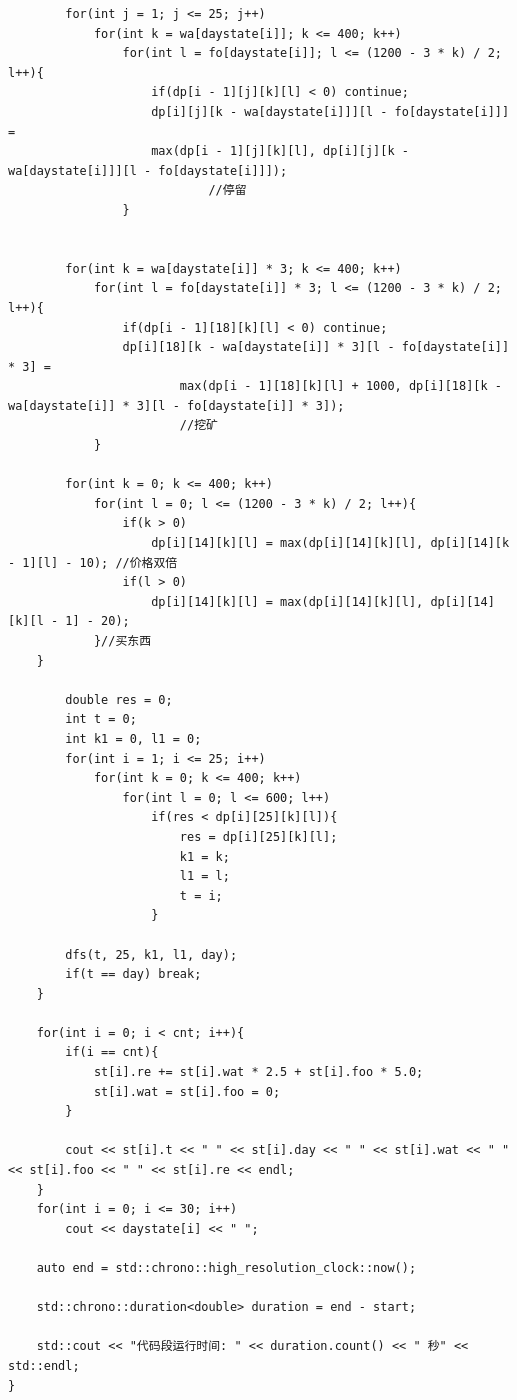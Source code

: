 \begin{verbatim}
        for(int j = 1; j <= 25; j++)
            for(int k = wa[daystate[i]]; k <= 400; k++)   
                for(int l = fo[daystate[i]]; l <= (1200 - 3 * k) / 2; l++){
                    if(dp[i - 1][j][k][l] < 0) continue;
                    dp[i][j][k - wa[daystate[i]]][l - fo[daystate[i]]] = 
                    max(dp[i - 1][j][k][l], dp[i][j][k - wa[daystate[i]]][l - fo[daystate[i]]]);
                            //停留
                }

        
        for(int k = wa[daystate[i]] * 3; k <= 400; k++)   
            for(int l = fo[daystate[i]] * 3; l <= (1200 - 3 * k) / 2; l++){
                if(dp[i - 1][18][k][l] < 0) continue;
                dp[i][18][k - wa[daystate[i]] * 3][l - fo[daystate[i]] * 3] = 
                        max(dp[i - 1][18][k][l] + 1000, dp[i][18][k - wa[daystate[i]] * 3][l - fo[daystate[i]] * 3]);
                        //挖矿
            }

        for(int k = 0; k <= 400; k++)   
            for(int l = 0; l <= (1200 - 3 * k) / 2; l++){
                if(k > 0)
                    dp[i][14][k][l] = max(dp[i][14][k][l], dp[i][14][k - 1][l] - 10); //价格双倍
                if(l > 0)
                    dp[i][14][k][l] = max(dp[i][14][k][l], dp[i][14][k][l - 1] - 20);
            }//买东西
    }

        double res = 0;
        int t = 0;
        int k1 = 0, l1 = 0;
        for(int i = 1; i <= 25; i++)
            for(int k = 0; k <= 400; k++)
                for(int l = 0; l <= 600; l++)
                    if(res < dp[i][25][k][l]){
                        res = dp[i][25][k][l];
                        k1 = k;
                        l1 = l;
                        t = i;
                    }
        
        dfs(t, 25, k1, l1, day);
        if(t == day) break;
    }
    
    for(int i = 0; i < cnt; i++){
        if(i == cnt){
            st[i].re += st[i].wat * 2.5 + st[i].foo * 5.0;
            st[i].wat = st[i].foo = 0;
        }

        cout << st[i].t << " " << st[i].day << " " << st[i].wat << " " << st[i].foo << " " << st[i].re << endl;
    }
    for(int i = 0; i <= 30; i++)
        cout << daystate[i] << " ";
    
    auto end = std::chrono::high_resolution_clock::now();

    std::chrono::duration<double> duration = end - start;

    std::cout << "代码段运行时间: " << duration.count() << " 秒" << std::endl;
}
\end{verbatim}

